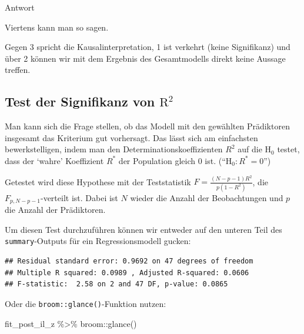 \documentclass[
]{book}
\newenvironment{Shaded}{\begin{snugshade}}{\end{snugshade}}
\newcommand{\FunctionTok}[1]{\textcolor[rgb]{0.00,0.00,0.00}{#1}}
\newcommand{\NormalTok}[1]{#1}
\newcommand{\SpecialCharTok}[1]{\textcolor[rgb]{0.00,0.00,0.00}{#1}}
\begin{document}
Antwort

Viertens kann man so sagen.

Gegen 3 spricht die Kausalinterpretation, 1 ist verkehrt (keine Signifikanz) und über 2 können wir mit dem Ergebnis des Gesamtmodells direkt keine Aussage treffen.

\hypertarget{test-der-signifikanz-von-textr2}{%
\subsection{\texorpdfstring{Test der Signifikanz von \(\text{R}^2\)}{Test der Signifikanz von \textbackslash text\{R\}\^{}2}}\label{test-der-signifikanz-von-textr2}}

Man kann sich die Frage stellen, ob das Modell mit den gewählten Prädiktoren insgesamt das Kriterium gut vorhersagt. Das lässt sich am einfachsten bewerkstelligen, indem man den Determinationskoeffizienten \(R^2\) auf die \(\text{H}_0\) testet, dass der `wahre' Koeffizient \(R^*\) der Population gleich 0 ist. (``\(\text{H}_0: R^* = 0\)'')

Getestet wird diese Hypothese mit der Teststatistik \(F = \frac{(N-p-1)R^2}{p(1-R^2)}\), die \(F_{p,N-p-1}\)-verteilt ist. Dabei ist \(N\) wieder die Anzahl der Beobachtungen und \(p\) die Anzahl der Prädiktoren.

Um diesen Test durchzuführen können wir entweder auf den unteren Teil des \texttt{summary}-Outputs für ein Regressionsmodell gucken:

\begin{verbatim}
## Residual standard error: 0.9692 on 47 degrees of freedom
## Multiple R squared: 0.0989 , Adjusted R-squared: 0.0606
## F-statistic:  2.58 on 2 and 47 DF, p-value: 0.0865
\end{verbatim}

Oder die \texttt{broom::glance()}-Funktion nutzen:

\begin{Shaded}
\begin{Highlighting}[]
\NormalTok{fit\_post\_il\_z }\SpecialCharTok{\%\textgreater{}\%} 
\NormalTok{  broom}\SpecialCharTok{::}\FunctionTok{glance}\NormalTok{()}
\end{Highlighting}
\end{Shaded}

 
  \providecommand{\huxb}[2]{\arrayrulecolor[RGB]{#1}\global\arrayrulewidth=#2pt}
  \providecommand{\huxvb}[2]{\color[RGB]{#1}\vrule width #2pt}
  \providecommand{\huxtpad}[1]{\rule{0pt}{#1}}
  \providecommand{\huxbpad}[1]{\rule[-#1]{0pt}{#1}}
\end{document}

